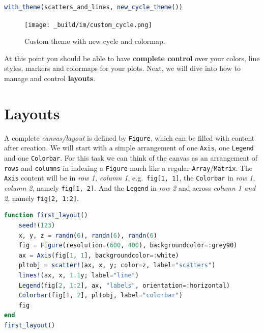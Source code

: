 \documentclass[
  notoc %
]{tufte-book}
\newcommand{\passthrough}[1]{#1}
\begin{document}
\begin{lstlisting}[language=Julia]
with_theme(scatters_and_lines, new_cycle_theme())
\end{lstlisting}

\begin{figure}
\hypertarget{fig:custom_cycle}{%
\centering
\texttt{[image: \_build/im/custom\_cycle.png]}
\caption{Custom theme with new cycle and
colormap.}\label{fig:custom_cycle}
}
\end{figure}

At this point you should be able to have \textbf{complete control} over
your colors, line styles, markers and colormaps for your plots. Next, we
will dive into how to manage and control \textbf{layouts}.

\hypertarget{sec:makie_layouts}{%
\section{Layouts}\label{sec:makie_layouts}}

A complete \emph{canvas/layout} is defined by
\passthrough{\lstinline!Figure!}, which can be filled with content after
creation. We will start with a simple arrangement of one
\passthrough{\lstinline!Axis!}, one \passthrough{\lstinline!Legend!} and
one \passthrough{\lstinline!Colorbar!}. For this task we can think of
the canvas as an arrangement of \passthrough{\lstinline!rows!} and
\passthrough{\lstinline!columns!} in indexing a
\passthrough{\lstinline!Figure!} much like a regular
\passthrough{\lstinline!Array!}/\passthrough{\lstinline!Matrix!}. The
\passthrough{\lstinline!Axis!} content will be in \emph{row 1, column
1}, e.g.~\passthrough{\lstinline!fig[1, 1]!}, the
\passthrough{\lstinline!Colorbar!} in \emph{row 1, column 2}, namely
\passthrough{\lstinline!fig[1, 2]!}. And the
\passthrough{\lstinline!Legend!} in \emph{row 2} and across \emph{column
1 and 2}, namely \passthrough{\lstinline!fig[2, 1:2]!}.

\begin{lstlisting}[language=Julia]
function first_layout()
    seed!(123)
    x, y, z = randn(6), randn(6), randn(6)
    fig = Figure(resolution=(600, 400), backgroundcolor=:grey90)
    ax = Axis(fig[1, 1], backgroundcolor=:white)
    pltobj = scatter!(ax, x, y; color=z, label="scatters")
    lines!(ax, x, 1.1y; label="line")
    Legend(fig[2, 1:2], ax, "labels", orientation=:horizontal)
    Colorbar(fig[1, 2], pltobj, label="colorbar")
    fig
end
first_layout()
\end{lstlisting}
\end{document}
